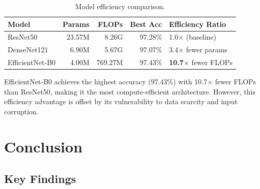 \documentclass[11pt, a4paper]{article}
\begin{document}
\begin{table}[H]
\centering
\caption{Model efficiency comparison.}
\label{tab:efficiency}
\begin{tabular}{lrrrl}
\toprule
\textbf{Model} & \textbf{Params} & \textbf{FLOPs} & \textbf{Best Acc} & \textbf{Efficiency Ratio} \\
\midrule
ResNet50 & 23.57M & 8.26G & 97.28\% & 1.0$\times$ (baseline) \\
DenseNet121 & 6.90M & 5.67G & 97.07\% & 3.4$\times$ fewer params \\
EfficientNet-B0 & 4.00M & 769.27M & 97.43\% & \textbf{10.7$\times$} fewer FLOPs \\
\bottomrule
\end{tabular}
\end{table}

EfficientNet-B0 achieves the highest accuracy (97.43\%) with 10.7$\times$ fewer FLOPs than ResNet50, making it the most compute-efficient architecture. However, this efficiency advantage is offset by its vulnerability to data scarcity and input corruption.

\section{Conclusion}

\subsection{Key Findings}
\end{document}
